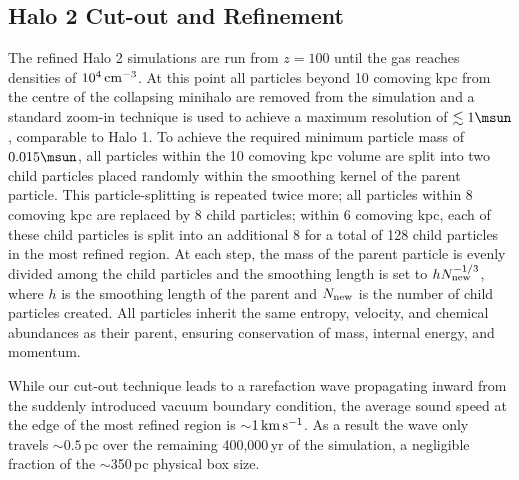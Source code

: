 \subsection{Halo 2 Cut-out and Refinement}
\label{cutout}

The refined Halo 2 simulations are run from $z=100$ until the gas reaches densities of $10^4\,{\rm cm}^{-3}$.  At this point all particles beyond 10 comoving kpc from the centre of the collapsing minihalo are removed from the simulation and a standard zoom-in technique is used to achieve a maximum resolution of $\lesssim 1\msun$, comparable to Halo 1. To achieve the required minimum particle mass of $0.015\msun$, all particles within the 10 comoving kpc volume are split into two child particles placed randomly within the smoothing kernel of the parent particle.  This particle-splitting is repeated twice more; all particles within 8 comoving kpc are replaced by 8 child particles; within 6 comoving kpc, each of these child particles is split into an additional 8 for a total of 128 child particles in the most refined region.  At each step, the mass of the parent particle is evenly divided among the child particles and the smoothing length is set to $h N_{\rm new}^{-1/3}$, where $h$ is the smoothing length of the parent and $N_{\rm new}$ is the number of child particles created.  All particles inherit the same entropy, velocity, and chemical abundances as their parent, ensuring conservation of mass, internal energy, and momentum.

While our cut-out technique leads to a rarefaction wave propagating inward from the suddenly introduced vacuum boundary condition, the average sound speed at the edge of the most refined region is $\sim$$1\,{\rm km}\,{\rm s}^{-1}$.  As a result the wave only travels $\sim$$0.5\,$pc over the remaining 400,000$\,$yr of the simulation, a negligible fraction of the $\sim$350$\,$pc physical box size.